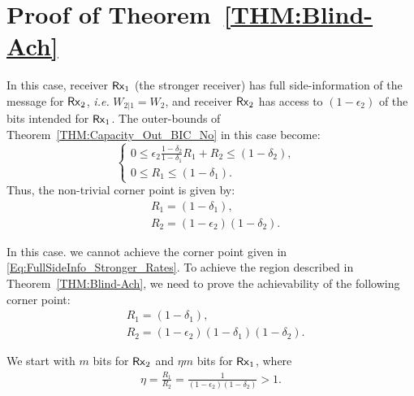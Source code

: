 \documentclass[journal,12pt,draftcls,onecolumn]{IEEEtran}
\begin{document}
\section{Proof of Theorem~\ref{THM:Blind-Ach}} \label{Section:Achievability_BlindInner}

In this case, receiver ${\sf Rx}_1$ (the stronger receiver) has full side-information of the message for ${\sf Rx}_2$, \emph{i.e.} $W_{2|1} = W_2$, and receiver ${\sf Rx}_2$ has access to $(1-\epsilon_2)$ of the bits intended for ${\sf Rx}_1$. The outer-bounds of Theorem~\ref{THM:Capacity_Out_BIC_No} in this case become:
\begin{equation}
\label{Eq:FullSideInfo_Stronger}
\left\{ \begin{array}{ll}
0 \leq \epsilon_2 \frac{1-\delta_2}{1-\delta_1} R_1 + R_2 \leq \left( 1 - \delta_2 \right), & \\
0 \leq R_1 \leq \left( 1 - \delta_1 \right).
\end{array} \right.
\end{equation}
Thus, the non-trivial corner point is given by:
\begin{align}
\label{Eq:FullSideInfo_Stronger_Rates}
&R_1 = (1-\delta_1), \nonumber \\
&R_2 = (1-\epsilon_2)(1-\delta_2).
\end{align}

In this case. we cannot achieve the corner point given in \eqref{Eq:FullSideInfo_Stronger_Rates}. To achieve the region described in Theorem~\ref{THM:Blind-Ach}, we need to prove the achievability of the following corner point:
\begin{align}
\label{Eq:FullSideInfo_Stronger_Rates_Inner}
&R_1 = (1-\delta_1), \nonumber \\
&R_2 = (1-\epsilon_2)(1-\delta_1)(1-\delta_2).
\end{align}


 We start with $m$ bits for ${\sf Rx}_2$ and $\eta m$ bits for ${\sf Rx}_1$, where
\begin{align}
\eta = \frac{R_1}{R_2} = \frac{1}{(1-\epsilon_2)(1-\delta_2)} > 1.
\end{align}
\end{document}
